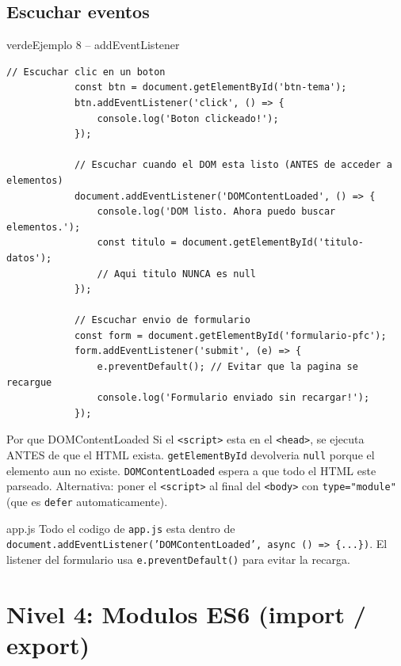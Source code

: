 \documentclass[11pt,a4paper]{article}
\begin{document}
	\subsection{Escuchar eventos}
	
	\begin{cajacodigo}{verde}{Ejemplo 8 -- addEventListener}
		\begin{lstlisting}[style=codejs]
			// Escuchar clic en un boton
			const btn = document.getElementById('btn-tema');
			btn.addEventListener('click', () => {
				console.log('Boton clickeado!');
			});
			
			// Escuchar cuando el DOM esta listo (ANTES de acceder a elementos)
			document.addEventListener('DOMContentLoaded', () => {
				console.log('DOM listo. Ahora puedo buscar elementos.');
				const titulo = document.getElementById('titulo-datos');
				// Aqui titulo NUNCA es null
			});
			
			// Escuchar envio de formulario
			const form = document.getElementById('formulario-pfc');
			form.addEventListener('submit', (e) => {
				e.preventDefault(); // Evitar que la pagina se recargue
				console.log('Formulario enviado sin recargar!');
			});
		\end{lstlisting}
	\end{cajacodigo}
	
	\begin{cajaconcepto}{Por que DOMContentLoaded}
		Si el \texttt{<script>} esta en el \texttt{<head>}, se ejecuta ANTES de que el HTML exista. \texttt{getElementById} devolveria \texttt{null} porque el elemento aun no existe. \texttt{DOMContentLoaded} espera a que todo el HTML este parseado. Alternativa: poner el \texttt{<script>} al final del \texttt{<body>} con \texttt{type="module"} (que es \texttt{defer} automaticamente).
	\end{cajaconcepto}
	
	\begin{cajapractica}{app.js}
		Todo el codigo de \texttt{app.js} esta dentro de \texttt{document.addEventListener('DOMContentLoaded', async () => \{...\})}. El listener del formulario usa \texttt{e.preventDefault()} para evitar la recarga.
	\end{cajapractica}
	
	\section{Nivel 4: Modulos ES6 (import / export)}
	
\end{document}
